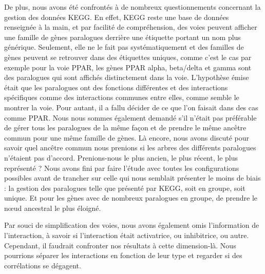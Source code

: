 \par De plus, nous avons été confrontés à de nombreux questionnements concernant la gestion des données KEGG. En effet, KEGG reste une base de données renseignée à la main, et par facilité de compréhension, des voies peuvent afficher une famille de gènes paralogues derrière une étiquette portant un nom plus générique. Seulement, elle ne le fait pas systématiquement et des familles de gènes peuvent se retrouver dans des étiquettes uniques, comme c’est le cas par exemple pour la voie PPAR, les gènes PPAR alpha, beta/delta et gamma sont des paralogues qui sont affichés distinctement dans la voie. L’hypothèse émise était que les paralogues ont des fonctions différentes et des interactions spécifiques comme des interactions communes entre elles, comme semble le montrer la voie. Pour autant, il a fallu décider de ce que l’on faisait dans des cas comme PPAR. Nous nous sommes également demandé s’il n’était pas préférable de gérer tous les paralogues de la même façon et de prendre le même ancêtre commun pour une même famille de gènes. Là encore, nous avons discuté pour savoir quel ancêtre commun nous prenions si les arbres des différents paralogues n’étaient pas d’accord. Prenions-nous le plus ancien, le plus récent, le plus représenté ? Nous avons fini par faire l’étude avec toutes les configurations possibles avant de trancher sur celle qui nous semblait présenter le moins de biais : la gestion des paralogues telle que présenté par KEGG, soit en groupe, soit unique. Et pour les gènes avec de nombreux paralogues en groupe, de prendre le nœud ancestral le plus éloigné. 
\par Par souci de simplification des voies, nous avons également omis l’information de l’interaction, à savoir si l’interaction était activatrice, ou inhibitrice, ou autre. Cependant, il faudrait confronter nos résultats à cette dimension-là. Nous pourrions séparer les interactions en fonction de leur type et regarder si des corrélations se dégagent. 

\newpage
